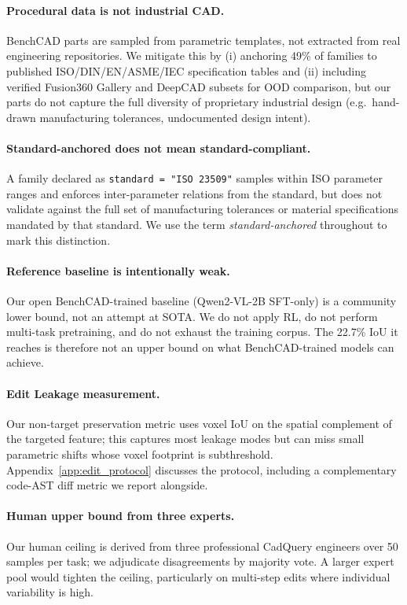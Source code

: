 \documentclass{article}
\begin{document}
\paragraph{Procedural data is not industrial CAD.} BenchCAD parts are sampled from parametric templates, not extracted from real engineering repositories. We mitigate this by (i) anchoring 49\% of families to published ISO/DIN/EN/ASME/IEC specification tables and (ii) including verified Fusion360 Gallery and DeepCAD subsets for OOD comparison, but our parts do not capture the full diversity of proprietary industrial design (e.g.\ hand-drawn manufacturing tolerances, undocumented design intent).

\paragraph{Standard-anchored does not mean standard-compliant.} A family declared as \texttt{standard = "ISO 23509"} samples within ISO parameter ranges and enforces inter-parameter relations from the standard, but does not validate against the full set of manufacturing tolerances or material specifications mandated by that standard. We use the term \emph{standard-anchored} throughout to mark this distinction.

\paragraph{Reference baseline is intentionally weak.} Our open BenchCAD-trained baseline (Qwen2-VL-2B SFT-only) is a community lower bound, not an attempt at SOTA. We do not apply RL, do not perform multi-task pretraining, and do not exhaust the training corpus. The 22.7\% IoU it reaches is therefore not an upper bound on what BenchCAD-trained models can achieve.

\paragraph{Edit Leakage measurement.} Our non-target preservation metric uses voxel IoU on the spatial complement of the targeted feature; this captures most leakage modes but can miss small parametric shifts whose voxel footprint is subthreshold. Appendix~\ref{app:edit_protocol} discusses the protocol, including a complementary code-AST diff metric we report alongside.

\paragraph{Human upper bound from three experts.} Our human ceiling is derived from three professional CadQuery engineers over 50 samples per task; we adjudicate disagreements by majority vote. A larger expert pool would tighten the ceiling, particularly on multi-step edits where individual variability is high.
\end{document}
